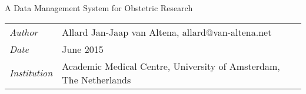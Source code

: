 \thispagestyle{empty}

\addvspace{40mm}

\begin{center}
	\bigskip
	\huge{A Data Management System for Obstetric Research}
\end{center}


\addvspace{140mm}

\begin{center}
	\begin{tabular}{l l}
		\textit{Author}			&	Allard Jan-Jaap van Altena, allard@van-altena.net\\
		\textit{Date}			&	June 2015 \\
		\textit{Institution}	&	Academic Medical Centre, University of Amsterdam, The Netherlands \\
	\end{tabular}
\end{center}

\clearpage